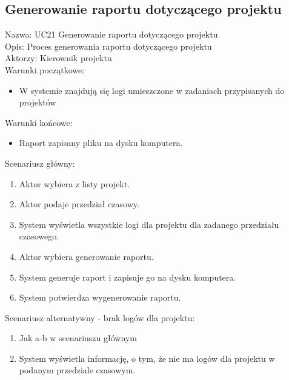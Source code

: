 \subsection{Generowanie raportu dotyczącego projektu}
Nazwa: UC21 Generowanie raportu dotyczącego projektu \\
Opis: Proces generowania raportu dotyczącego projektu \\
Aktorzy: Kierownik projektu \\
Warunki początkowe:
\begin{itemize}
\item W systemie znajdują się logi umieszczone w zadaniach przypisanych do projektów
\end{itemize}
Warunki końcowe:
\begin{itemize}
\item Raport zapisany pliku na dysku komputera.
\end{itemize}
Scenariusz główny:
\begin{enumerate}
\item Aktor wybiera z listy projekt.
\item Aktor podaje przedział czasowy.
\item System wyświetla wszystkie logi dla projektu dla zadanego przedziału czasowego.
\item Aktor wybiera generowanie raportu.
\item System generuje raport i zapisuje go na dysku komputera.
\item System potwierdza wygenerowanie raportu.
\end{enumerate}
Scenariusz alternatywny - brak logów dla projektu: 
\begin{enumerate}
\item Jak a-b w scenariuszu głównym
\item System wyświetla informację, o tym, że nie ma logów dla projektu w podanym przedziale czasowym.
\end{enumerate}


